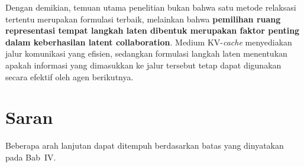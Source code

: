 Dengan demikian, temuan utama penelitian bukan bahwa satu metode relaksasi
tertentu merupakan formulasi terbaik, melainkan bahwa \textbf{pemilihan
ruang representasi tempat langkah laten dibentuk merupakan faktor penting
dalam keberhasilan latent collaboration}. Medium KV-\textit{cache} menyediakan jalur
komunikasi yang efisien, sedangkan formulasi langkah laten menentukan apakah
informasi yang dimasukkan ke jalur tersebut tetap dapat digunakan secara
efektif oleh agen berikutnya.

\section{Saran}

Beberapa arah lanjutan dapat ditempuh berdasarkan batas yang dinyatakan pada
Bab~IV.


